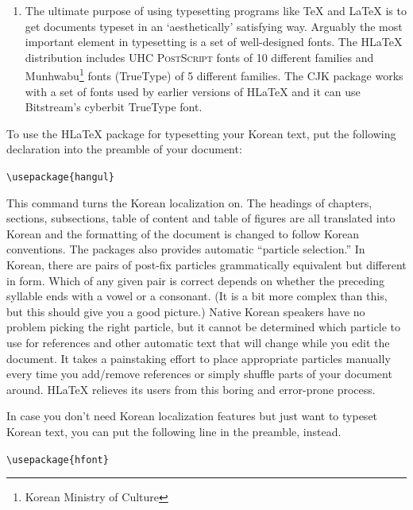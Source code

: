 \begin{enumerate}
The CJK package is not specific to Korean. It can
process input files in UTF-8 as well as in various CJK encodings
including EUC-KR and CP949/Windows-949/UHC, it can be used to typeset documents with
multilingual content (especially Chinese, Japanese and Korean).
The CJK package has no Korean localization such as the one offered by H\LaTeX{} and it
does not come with as many special Korean fonts as H\LaTeX.

\item The ultimate purpose of using typesetting programs like \TeX{}
and \LaTeX{} is to get documents typeset in an `aesthetically' satisfying way.
Arguably the most important element in typesetting is  a set of
well-designed fonts. The H\LaTeX{} distribution
includes UHC \textsc{PostScript} fonts 
of 10
different families and
Munhwabu\footnote{Korean Ministry of Culture}
fonts (TrueType) of 5 different families.
The CJK package works with a set of fonts used by earlier versions
of H\LaTeX{} and it can use Bitstream's cyberbit TrueType
font.
\end{enumerate}

To use the  H\LaTeX{} package for typesetting your Korean text, put the following
declaration into the preamble of your document:
\begin{lscommand}
\verb+\usepackage{hangul}+
\end{lscommand}

This command turns the Korean localization on. The headings
of chapters, sections, subsections, table of content and table of
figures are all translated into Korean and the formatting of the document
is changed to follow Korean conventions. 
The packages also provides automatic ``particle selection.''
In Korean, there are pairs of post-fix particles 
grammatically equivalent but different in form. Which 
of any given pair is correct depends on 
whether the preceding syllable ends with a  vowel or a consonant.
(It is a bit more complex than this, but this should give you
a good picture.)
Native Korean speakers have no problem picking the right particle, but
it cannot be determined which particle to use for references and other automatic
text that will change while you edit the document.
It 
takes a painstaking effort to place appropriate particles manually
every time you add/remove references or simply shuffle  parts
of your document around.
H\LaTeX{} relieves its users from this boring and error-prone process.

In case you don't need Korean localization features
but just want 
to  typeset Korean text, you can put the following line in the 
preamble, instead.
\begin{lscommand}
\verb+\usepackage{hfont}+
\end{lscommand}

